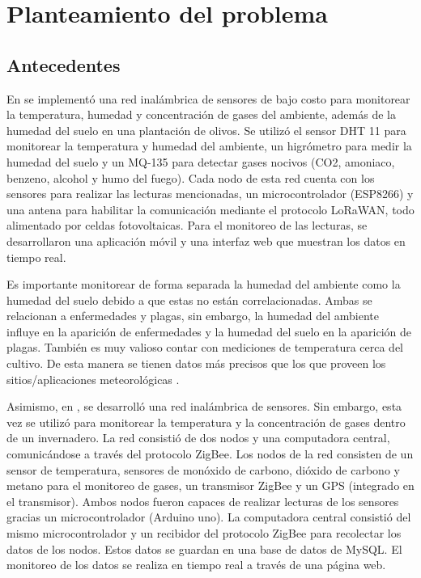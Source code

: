 \section{Planteamiento del problema}

\subsection{Antecedentes}

En \cite{olive_orchard_monitorization} se implementó una red inalámbrica de sensores de bajo costo para monitorear la temperatura, humedad y concentración de gases del ambiente, además de la humedad del suelo en una plantación de olivos. Se utilizó el sensor DHT 11 para monitorear la temperatura y humedad del ambiente, un higrómetro para medir la humedad del suelo y un MQ-135 para detectar gases nocivos (CO2, amoniaco, benzeno, alcohol y humo del fuego). Cada nodo de esta red cuenta con los sensores para realizar las lecturas mencionadas, un microcontrolador (ESP8266) y una antena para habilitar la comunicación mediante el protocolo LoRaWAN, todo alimentado por celdas fotovoltaicas. Para el monitoreo de las lecturas, se desarrollaron una aplicación móvil y una interfaz web que muestran los datos en tiempo real.

Es importante monitorear de forma separada la humedad del ambiente como la humedad del suelo debido a que estas no están correlacionadas. Ambas se relacionan a enfermedades y plagas, sin embargo, la humedad del ambiente influye en la aparición de enfermedades y la humedad del suelo en la aparición de plagas. También es muy valioso contar con mediciones de temperatura cerca del cultivo. De esta manera se tienen datos más precisos que los que proveen los sitios/aplicaciones meteorológicas \cite{olive_orchard_monitorization}.

Asimismo, en \cite{wsn_greenhouse_gases}, se desarrolló una red inalámbrica de sensores. Sin embargo, esta vez se utilizó para monitorear la temperatura y la concentración de gases dentro de un invernadero. La red consistió de dos nodos y una computadora central, comunicándose a través del protocolo ZigBee. Los nodos de la red consisten de un sensor de temperatura, sensores de monóxido de carbono, dióxido de carbono y metano para el monitoreo de gases, un transmisor ZigBee y un GPS (integrado en el transmisor). Ambos nodos fueron capaces de realizar lecturas de los sensores gracias un microcontrolador (Arduino uno). La computadora central consistió del mismo microcontrolador y un recibidor del protocolo ZigBee para recolectar los datos de los nodos. Estos datos se guardan en una base de datos de MySQL. El monitoreo de los datos se realiza en tiempo real a través de una página web.

